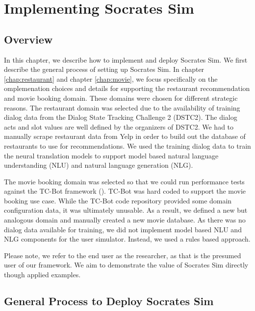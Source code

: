 \chapter{Implementing Socrates Sim}
\label{chap:implementation}

\section{Overview}

In this chapter, we describe how to implement and deploy Socrates Sim. We first describe the general process of setting up Socrates Sim. In chapter \ref{chap:restaurant} and chapter \ref{chap:movie}, we focus specifically on the omplemenation choices and details for supporting the restaurant recommendation and movie booking domain. These domains were chosen for different strategic reasons. The restaurant domain was selected due to the availability of training dialog data from the Dialog State Tracking Challenge 2 (DSTC2). The dialog acts and slot values are well defined by the organizers of DSTC2. We had to manually scrape restaurant data from Yelp in order to build out the database of restaurants to use for recommendations. We used the training dialog data to train the neural translation models to support model based natural language understanding (NLU) and natural language generation (NLG). 

 The movie booking domain was selected so that we could run performance tests against the TC-Bot framework (\cite{li_end_to_end}). TC-Bot was hard coded to support the movie booking use case. While the TC-Bot code repository provided some domain configuration data, it was ultimately unusable. As a result, we defined a new but analogous domain and manually created a new movie database. As there was no dialog data available for training, we did not implement model based NLU and NLG components for the user simulator. Instead, we used a rules based approach. 
 
Please note, we refer to the end user as the researcher, as that is the presumed user of our framework. We aim to demonstrate the value of Socrates Sim directly though applied examples. 

\section{General Process to Deploy Socrates Sim}


